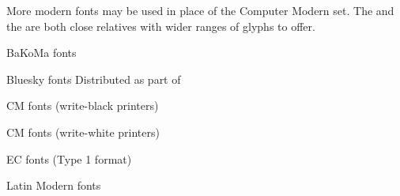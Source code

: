 More modern fonts may be used in place of the Computer Modern set.  The
 and the %
 are both close relatives with
wider ranges of glyphs to offer.
\begin{ctanrefs}
\item[\nothtml{\rmfamily}BaKoMa fonts]
\item[\nothtml{\rmfamily}Bluesky fonts]Distributed as part of
\item[\nothtml{\rmfamily}CM fonts (write-black printers)]
\item[\nothtml{\rmfamily}CM fonts (write-white printers)]
\item[\nothtml{\rmfamily}EC fonts (Type 1 format)]
\item[\nothtml{\rmfamily}Latin Modern fonts]
\end{ctanrefs}
